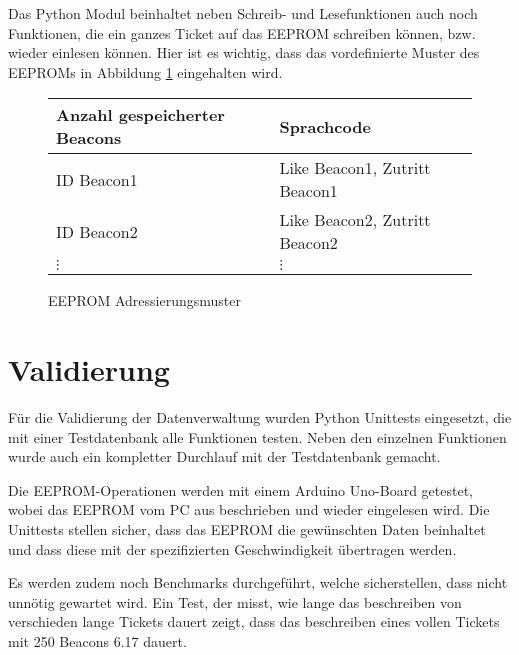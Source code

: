 Das Python Modul beinhaltet neben Schreib- und Lesefunktionen auch noch Funktionen, die ein ganzes Ticket auf das EEPROM schreiben können, bzw. wieder einlesen können.
Hier ist es wichtig, dass das vordefinierte Muster des EEPROMs in Abbildung \ref{eeprom_memory_pattern} eingehalten wird.


\begin{figure}
	\begin{tabular}{l|l}
		Anzahl gespeicherter Beacons & Sprachcode                      \\ \hline
		ID Beacon1                   & Like Beacon1, Zutritt Beacon1   \\ \hline
		ID Beacon2                   & Like Beacon2, Zutritt Beacon2   \\ \hline
		\(\vdots\)                   & \(\vdots\) 
	\end{tabular}
	\caption{EEPROM Adressierungsmuster}
	\label{eeprom_memory_pattern}
\end{figure}

\section{Validierung}
Für die Validierung der Datenverwaltung wurden Python Unittests eingesetzt, die mit einer Testdatenbank alle Funktionen testen.
Neben den einzelnen Funktionen wurde auch ein kompletter Durchlauf mit der Testdatenbank gemacht.

Die EEPROM-Operationen werden mit einem Arduino Uno-Board getestet, wobei das EEPROM vom PC aus beschrieben und wieder eingelesen wird.
Die Unittests stellen sicher, dass das EEPROM die gewünschten Daten beinhaltet und dass diese mit der spezifizierten Geschwindigkeit übertragen werden.

Es werden zudem noch Benchmarks durchgeführt, welche sicherstellen, dass nicht unnötig gewartet wird.
Ein Test, der misst, wie lange das beschreiben von verschieden lange Tickets dauert zeigt, dass das beschreiben eines vollen Tickets mit 250 Beacons 6.17 dauert.

